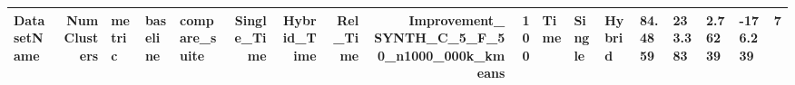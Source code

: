 \begin{tabular}{lrlllrrrrr}
\toprule
DatasetName & NumClusters & metric & baseline & compare_suite & Single_Time & Hybrid_Time & Rel_Time & Improvement_%
\midrule
SYNTH_C_5_F_50_n1000_000k_kmeans & 100 & Time & Single & Hybrid & 84.4859 & 233.383 & 2.76239 & -176.239 & 7 \\
\bottomrule
\end{tabular}
